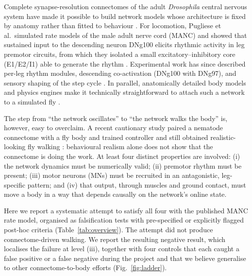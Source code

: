 \documentclass[11pt]{article}
\begin{document}
Complete synapse-resolution connectomes of the adult \textit{Drosophila} central nervous system have made it possible to build network models whose architecture is fixed by anatomy rather than fitted to behaviour \citep{takemura2024manc,marin2024manc,cheong2024premotor,shiu2024brain}. For locomotion, Pugliese et al.\ simulated rate models of the male adult nerve cord (MANC) and showed that sustained input to the descending neuron DNg100 elicits rhythmic activity in leg premotor circuits, from which they isolated a small excitatory--inhibitory core (E1/E2/I1) able to generate the rhythm \citep{pugliese2026}. Experimental work has since described per-leg rhythm modules, descending co-activation (DNg100 with DNg97), and sensory shaping of the step cycle \citep{sapkal2026}. In parallel, anatomically detailed body models and physics engines make it technically straightforward to attach such a network to a simulated fly \citep{todorov2012mujoco,wangchen2024nmf,vaxenburg2025flybody,ozdil2025flymimic}.

The step from ``the network oscillates'' to ``the network walks the body'' is, however, easy to overclaim. A recent cautionary study paired a nematode connectome with a fly body and trained controller and still obtained realistic-looking fly walking \citep{brunton2026sphinx}: behavioural realism alone does not show that the connectome is doing the work. At least four distinct properties are involved: (i) the network dynamics must be numerically valid; (ii) premotor rhythm must be present; (iii) motor neurons (MNs) must be recruited in an antagonistic, leg-specific pattern; and (iv) that output, through muscles and ground contact, must move a body in a way that depends causally on the network's online state.

Here we report a systematic attempt to satisfy all four with the published MANC rate model, organised as falsification tests with pre-specified or explicitly flagged post-hoc criteria (Table~\ref{tab:overview}). The attempt did not produce connectome-driven walking. We report the resulting negative result, which localises the failure at level (iii), together with four controls that each caught a false positive or a false negative during the project and that we believe generalise to other connectome-to-body efforts (Fig.~\ref{fig:ladder}).
\end{document}
